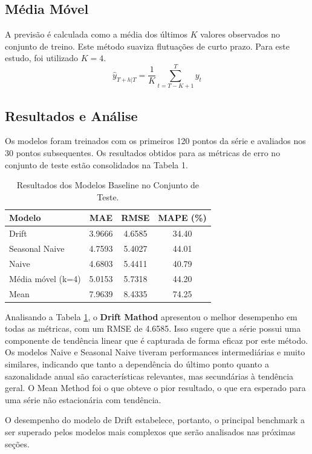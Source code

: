 \documentclass{article}
\begin{document}
\subsection*{Média Móvel}
A previsão é calculada como a média dos últimos $K$ valores observados no conjunto de treino. Este método suaviza flutuações de curto prazo. Para este estudo, foi utilizado $K=4$.
$$ \hat{y}_{T+h|T} = \frac{1}{K}\sum_{t=T-K+1}^{T}y_t $$

\subsection*{Resultados e Análise}
Os modelos foram treinados com os primeiros 120 pontos da série e avaliados nos 30 pontos subsequentes. Os resultados obtidos para as métricas de erro no conjunto de teste estão consolidados na Tabela 1.

\begin{table}[h]
    \centering
    \begin{tabular}{|l|c|c|c|}
        \hline
        \textbf{Modelo} & \textbf{MAE} & \textbf{RMSE} & \textbf{MAPE (\%)} \\
        \hline
        Drift & 3.9666 & 4.6585 & 34.40 \\
        Seasonal Naive & 4.7593 & 5.4027 & 44.01 \\
        Naive & 4.6803 & 5.4411 & 40.79 \\
        Média móvel (k=4) & 5.0153 & 5.7318 & 44.20 \\
        Mean & 7.9639 & 8.4335 & 74.25 \\
        \hline
    \end{tabular}
    \caption{Resultados dos Modelos Baseline no Conjunto de Teste.}
    \label{tab:baseline_results}
\end{table}

Analisando a Tabela \ref{tab:baseline_results}, o \textbf{Drift Mathod} apresentou o melhor desempenho em todas as métricas, com um RMSE de 4.6585. Isso sugere que a série possui uma componente de tendência linear que é capturada de forma eficaz por este método. Os modelos Naive e Seasonal Naive tiveram performances intermediárias e muito similares, indicando que tanto a dependência do último ponto quanto a sazonalidade anual são características relevantes, mas secundárias à tendência geral. O Mean Method foi o que obteve o pior resultado, o que era esperado para uma série não estacionária com tendência.

O desempenho do modelo de Drift estabelece, portanto, o principal benchmark a ser superado pelos modelos mais complexos que serão analisados nas próximas seções.
\end{document}
